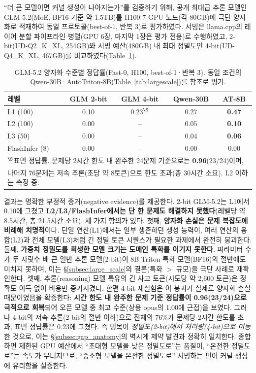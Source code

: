 \documentclass[sigplan,screen,review,anonymous]{acmart}
\begin{document}
``더 큰 모델이면 커널 생성이 나아지는가''를 검증하기 위해, 공개 최대급 추론 모델인 GLM-5.2(MoE, BF16 기준 약 1.5TB)를 H100 7-GPU 노드(각 80GB)에 극단 양자화로 적재하여 동일 프로토콜(best-of-1, 반복 3)로 평가하였다. 서빙은 llama.cpp의 레이어 분할 파이프라인 병렬(GPU 6장, 마지막 1장은 평가 전용)로 수행하였고, 2-bit(UD-Q2\_K\_XL, 254GB)와 서빙 예산(480GB) 내 최대 정밀도인 4-bit(UD-Q4\_K\_XL, 467GB)를 비교하였다(Table~\ref{tab:glmquant}).

\begin{table}[t]
\centering
\caption{GLM-5.2 양자화 수준별 정답률(Fast-0, H100, best-of-1·반복 3). 동일 조건의 Qwen-30B·AutoTriton-8B(Table~\ref{tab:largescale})를 참조로 병기.}
\label{tab:glmquant}
\begin{tabular}{lcccc}
\toprule
\textbf{레벨} & \textbf{GLM 2-bit} & \textbf{GLM 4-bit} & \textbf{Qwen-30B} & \textbf{AT-8B} \\
\midrule
L1 (100)       & 0.10 & 0.23$^{\S}$ & 0.27 & \textbf{0.47} \\
L2 (100)       & 0.00 & -- & 0.05 & \textbf{0.10} \\
L3 (50)        & 0.00 & -- & 0.04 & \textbf{0.06} \\
FlashInfer (8) & 0.00 & -- & 0.00 & 0.00 \\
\bottomrule
\multicolumn{5}{l}{\footnotesize $^{\S}$표면 정답률. 문제당 2시간 한도 내 완주한 24문제 기준으로는 \textbf{0.96}(23/24)이며,}\\
\multicolumn{5}{l}{\footnotesize 나머지 76문제는 저속 추론(초당 약 8토큰)으로 한도 초과(총 30시간 소요). L2 이하는 측정 중.}
\end{tabular}
\end{table}

결과는 명확한 부정적 증거(negative evidence)를 제공한다. 2-bit GLM-5.2는 L1에서 0.10에 그쳤고 \textbf{L2/L3/FlashInfer에서는 단 한 문제도 해결하지 못했다}(레벨당 약 8.5시간, 총 21.5시간 소요). 세 가지 함의가 있다. 첫째, \textbf{양자화 손실은 문제 복잡도에 비례해 치명적}이다. 단일 연산(L1)에서는 일부 생존하던 생성 능력이, 여러 연산의 융합(L2)과 전체 모델(L3)처럼 긴 정밀 토큰 시퀀스가 필요한 과제에서 완전히 붕괴한다. 둘째, \textbf{가중치 정밀도를 희생한 모델 크기는 도메인 특화를 이기지 못한다}. 파라미터 수가 두 자릿수 배 큰 일반 추론 모델(2-bit)이 8B Triton 특화 모델(BF16)의 절반에도 미치지 못하며, 이는 \S\ref{subsec:large_scale}의 결론(특화 $>$ 규모)을 극단 사례로 재확인한다. 셋째, 추론(reasoning) 모델 특유의 긴 사고 토큰(시도당 약 2,600 토큰)은 정확도 이득 없이 비용만 증가시켰다. 한편 4-bit 재실험은 이 붕괴가 실제로 양자화 손실 때문이었음을 확증한다: \textbf{시간 한도 내 완주한 문제 기준 정답률이 0.96(23/24)으로 극적으로 회복}되어 오픈 모델 중 최고 수준(상용 opus의 1.00에 근접)을 보였다. 그러나 4-bit의 저속 추론(2-bit의 절반 이하)으로 전체의 76\%가 문제당 2시간 한도를 초과, 표면 정답률은 0.23에 그쳤다. 즉 병목이 \emph{정밀도(2-bit)에서 처리량(4-bit)으로 이동}한 것으로, 이는 \S\ref{subsec:gap_anatomy}의 벽시계 제약 발견과 정확히 일치한다. 종합하면 제한된 GPU 예산에서 ``초대형 모델을 낮은 정밀도로''는 품질이, ``온전한 정밀도로''는 속도가 무너지므로, ``중소형 모델을 온전한 정밀도로'' 서빙하는 편이 커널 생성에 유리함을 실증한다.
\end{document}
